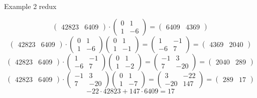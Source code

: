 \documentclass{beamer}
\begin{document}
\begin{frame}{Example 2 redux}
  
  $$\begin{pmatrix} 42823 & 6409 \end{pmatrix} \cdot \begin{pmatrix}0 & 1 \\
    1 & -6 \end{pmatrix} = \begin{pmatrix} 6409 & 4369 \end{pmatrix}$$
  $$\begin{pmatrix} 42823 & 6409 \end{pmatrix} \cdot \begin{pmatrix}0 & 1 \\
    1 & -6 \end{pmatrix} \begin{pmatrix}  0 & 1 \\ 1 & -1 \end{pmatrix}
  = \begin{pmatrix} 1 & -1 \\ -6 & 7 \end{pmatrix} = \begin{pmatrix}
    4369 & 2040 \end{pmatrix}$$
  $$\begin{pmatrix} 42823 & 6409 \end{pmatrix} \cdot \begin{pmatrix}1 & -1 \\
    -6 & 7 \end{pmatrix} \begin{pmatrix}  0 & 1 \\ 1 & -2 \end{pmatrix}
  = \begin{pmatrix} -1 & 3 \\  7 & -20 \end{pmatrix} = \begin{pmatrix}
    2040 & 289 \end{pmatrix}$$
  $$\begin{pmatrix} 42823 & 6409 \end{pmatrix} \cdot \begin{pmatrix}-1 & 3 \\
    7 & -20 \end{pmatrix} \begin{pmatrix}  0 & 1 \\ 1 & -7 \end{pmatrix}
  = \begin{pmatrix} 3 & -22 \\  -20 & 147 \end{pmatrix} = \begin{pmatrix}
    289 & 17 \end{pmatrix}$$
  $$-22 \cdot 42823 + 147 \cdot 6409 = 17$$
  
\end{frame}
  
\end{document}
